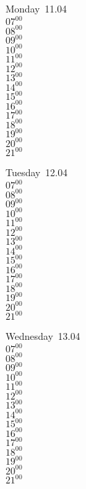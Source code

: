 \documentclass[11pt,a4paper]{book}\usepackage[]{graphicx}\usepackage[]{color}
\begin{document}
\begin{headerbox}
\end{headerbox}
\begin{weekdaybox}
  Monday~11.04\\
  { 
  \vfill
  $07^{00}$\\
$08^{00}$\\
$09^{00}$\\
$10^{00}$\\
$11^{00}$\\
$12^{00}$\\
$13^{00}$\\
$14^{00}$\\
$15^{00}$\\
$16^{00}$\\
$17^{00}$\\
$18^{00}$\\
$19^{00}$\\
$20^{00}$\\
$21^{00}$\\
  }
\end{weekdaybox}
\begin{weekdaybox}
  Tuesday~12.04\\
  { 
  \vfill
  $07^{00}$\\
$08^{00}$\\
$09^{00}$\\
$10^{00}$\\
$11^{00}$\\
$12^{00}$\\
$13^{00}$\\
$14^{00}$\\
$15^{00}$\\
$16^{00}$\\
$17^{00}$\\
$18^{00}$\\
$19^{00}$\\
$20^{00}$\\
$21^{00}$\\
  }
\end{weekdaybox}
\begin{weekdaybox}
  Wednesday~13.04\\
  { 
  \vfill
  $07^{00}$\\
$08^{00}$\\
$09^{00}$\\
$10^{00}$\\
$11^{00}$\\
$12^{00}$\\
$13^{00}$\\
$14^{00}$\\
$15^{00}$\\
$16^{00}$\\
$17^{00}$\\
$18^{00}$\\
$19^{00}$\\
$20^{00}$\\
$21^{00}$\\
  }
\end{weekdaybox}
\end{document}
